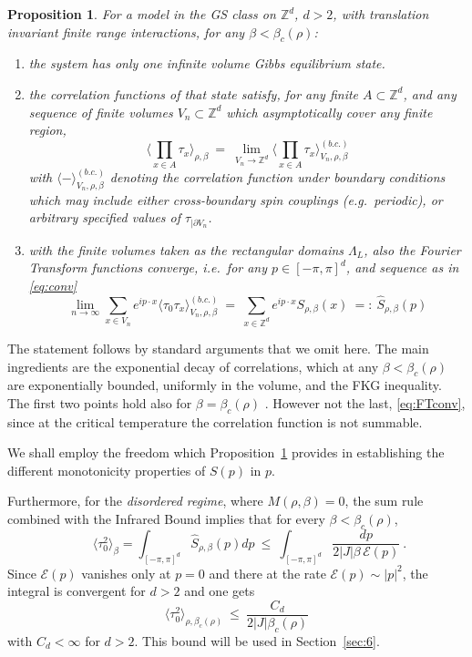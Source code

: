 \documentclass[a4paper,oneside,11pt]{article}
\def\Z{\mathbb{Z}}                          %
\newtheorem{proposition}[theorem]{Proposition}
\newcommand{\be}[1]{\begin{equation}\label{#1}}
\newcommand{\ee}{\end{equation}}
\numberwithin{equation}{section}
\numberwithin{equation}{section}
\numberwithin{equation}{section}
\newcommand{\calE}{\mathcal{E}}
\def\Z{\mathbb{Z}}                          %
\def\be{\begin{equation}}
\def\ee{\end{equation}}
\begin{document}
\begin{proposition}\label{prop:conv} For {a model in the GS class} on $\Z^d$,  $d >2$,  with translation invariant finite range interactions, for any $\beta < \beta_c(\rho)$: 
\begin{enumerate}  
\item the system has only one infinite volume Gibbs equilibrium state.  
\item the correlation functions of that state satisfy, for any finite $A\subset \Z^d$, and any sequence of finite volumes $V_n \subset \Z^d$ which asymptotically cover any finite region,
\be \label{eq:conv}
\big\langle \prod_{x\in A}\tau_x \big\rangle_{\rho,\beta}  \ = \  \lim_{V_n \to \Z^d}  
\big\langle \prod_{x\in A}\tau_x \big\rangle_{V_n,\rho, \beta}^{(b.c.)}
\ee 
with $\langle -\rangle_{V_n,\rho, \beta}^{(b.c.)}$ denoting the correlation function under  boundary conditions which may include either  cross-boundary spin couplings (e.g.~periodic), or arbitrary specified values of $\tau_{|\partial V_n}$.  
\item with the finite volumes taken as the rectangular domains $\Lambda_L$, also the Fourier Transform functions converge, i.e.~for any $ p  \in [-\pi ,\pi]^d$,  and sequence as in \eqref{eq:conv} 
\be \label{eq:FTconv}
\lim_{ n \to \infty}  \sum_{x\in V_n} e^{ip\cdot x} 
\langle \tau_0 \tau_x \rangle_{V_n,\rho, \beta}^{(b.c.)}  \ = \  
\sum_{x\in \Z^d}e^{ip\cdot x}S_{\rho,\beta}(x) \ =: \ 
\widehat S_{\rho,\beta}(p) 
\ee 
\end{enumerate} 
\end{proposition} 

The statement follows by standard arguments that we omit here.  The main  ingredients are the exponential decay of correlations, which at any $\beta<\beta_c(\rho)$ are exponentially bounded, uniformly in the volume,    and the FKG inequality.   The first two points hold also for 
$\beta=\beta_c(\rho)$ \cite{AizDumSid15}.  However not the last, \eqref{eq:FTconv},   since at the critical temperature the correlation function is not summable.   

We shall employ the freedom which Proposition~\ref{prop:conv} provides in establishing the different monotonicity properties of $S(p)$ in $p$.  

 Furthermore, for the {\em  disordered regime}, where $M(\rho,\beta)=0$, the sum rule combined with the Infrared Bound  implies that for every $\beta<\beta_c(\rho)$,
\be\label{eq:bound tau square}
  \qquad \langle\tau_0^2\rangle_\beta=\int_{[-\pi,\pi]^d} \widehat S_{\rho,\beta}(p)dp\ \leq\  \int_{[-\pi,\pi]^d} \frac{dp}{2|J|\beta \,\calE(p)} \ .
\ee
Since $\calE(p)$ vanishes only at $p=0$ and there at the rate $\calE(p)\sim |p|^2$,  the integral is convergent for $d>2$ and one gets  
 \be \label{sigma^2bound}
\langle\tau_0^2\rangle_{\rho,\beta_c(\rho)} \  \leq\    \frac{C_d}{2 |J|\beta_c(\rho)} 
\ee
with $C_d<\infty$ for $d>2$.   
This bound will be used in  Section~\ref{sec:6}.\\ 
\end{document}
